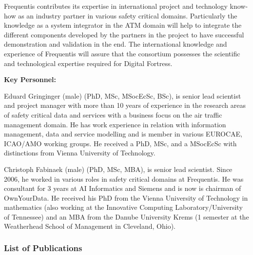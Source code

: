 \documentclass[a4paper,11pt]{article}
\begin{document}
Frequentis contributes its expertise in international project and technology know-how as an industry partner in various safety critical domains. Particularly the knowledge as a system integrator in the ATM domain will help to integrate the different components developed by the partners in the project to have successful demonstration and validation in the end. The international knowledge and experience of Frequentis will assure that the consortium possesses the scientific and technological expertise required for Digital Fortress.

\vspace{10pt}

\textbf{Key Personnel:}

Eduard Gringinger (male) (PhD, MSc, MSocEcSc, BSc), is senior lead scientist and project manager with more than 10 years of experience in the research areas of safety critical data and services with a business focus on the air traffic management domain. He has work experience in relation with information management, data and service modelling and is member in various EUROCAE, ICAO/AMO working groups. He received a PhD, MSc, and a MSocEcSc with distinctions from Vienna University of Technology.

Christoph Fabinaek (male) (PhD, MSc, MBA), is senior lead scientist. Since 2006, he worked in various roles in safety critical domains at Frequentis. He was consultant for 3 years at AI Informatics and Siemens and is now is chairman of OwnYourData. He received his PhD from the Vienna University of Technology in mathematics (also working at the Innovative Computing Laboratory/University of Tennessee) and an MBA from the Danube University Krems (1 semester at the Weatherhead School of Management in Cleveland, Ohio).

\subsubsection*{List of Publications}
\end{document}
